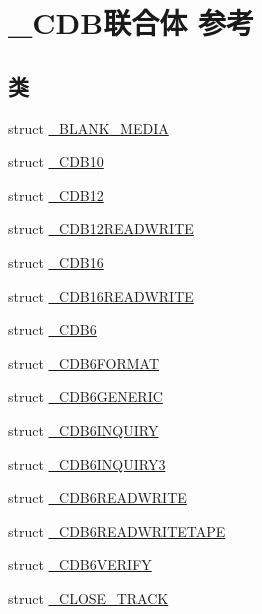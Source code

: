 \hypertarget{union___c_d_b}{}\section{\+\_\+\+C\+D\+B联合体 参考}
\label{union___c_d_b}
\subsection*{类}
\begin{DoxyCompactItemize}
\item 
struct \hyperlink{struct___c_d_b_1_1___b_l_a_n_k___m_e_d_i_a}{\+\_\+\+B\+L\+A\+N\+K\+\_\+\+M\+E\+D\+IA}
\item 
struct \hyperlink{struct___c_d_b_1_1___c_d_b10}{\+\_\+\+C\+D\+B10}
\item 
struct \hyperlink{struct___c_d_b_1_1___c_d_b12}{\+\_\+\+C\+D\+B12}
\item 
struct \hyperlink{struct___c_d_b_1_1___c_d_b12_r_e_a_d_w_r_i_t_e}{\+\_\+\+C\+D\+B12\+R\+E\+A\+D\+W\+R\+I\+TE}
\item 
struct \hyperlink{struct___c_d_b_1_1___c_d_b16}{\+\_\+\+C\+D\+B16}
\item 
struct \hyperlink{struct___c_d_b_1_1___c_d_b16_r_e_a_d_w_r_i_t_e}{\+\_\+\+C\+D\+B16\+R\+E\+A\+D\+W\+R\+I\+TE}
\item 
struct \hyperlink{struct___c_d_b_1_1___c_d_b6}{\+\_\+\+C\+D\+B6}
\item 
struct \hyperlink{struct___c_d_b_1_1___c_d_b6_f_o_r_m_a_t}{\+\_\+\+C\+D\+B6\+F\+O\+R\+M\+AT}
\item 
struct \hyperlink{struct___c_d_b_1_1___c_d_b6_g_e_n_e_r_i_c}{\+\_\+\+C\+D\+B6\+G\+E\+N\+E\+R\+IC}
\item 
struct \hyperlink{struct___c_d_b_1_1___c_d_b6_i_n_q_u_i_r_y}{\+\_\+\+C\+D\+B6\+I\+N\+Q\+U\+I\+RY}
\item 
struct \hyperlink{struct___c_d_b_1_1___c_d_b6_i_n_q_u_i_r_y3}{\+\_\+\+C\+D\+B6\+I\+N\+Q\+U\+I\+R\+Y3}
\item 
struct \hyperlink{struct___c_d_b_1_1___c_d_b6_r_e_a_d_w_r_i_t_e}{\+\_\+\+C\+D\+B6\+R\+E\+A\+D\+W\+R\+I\+TE}
\item 
struct \hyperlink{struct___c_d_b_1_1___c_d_b6_r_e_a_d_w_r_i_t_e_t_a_p_e}{\+\_\+\+C\+D\+B6\+R\+E\+A\+D\+W\+R\+I\+T\+E\+T\+A\+PE}
\item 
struct \hyperlink{struct___c_d_b_1_1___c_d_b6_v_e_r_i_f_y}{\+\_\+\+C\+D\+B6\+V\+E\+R\+I\+FY}
\item 
struct \hyperlink{struct___c_d_b_1_1___c_l_o_s_e___t_r_a_c_k}{\+\_\+\+C\+L\+O\+S\+E\+\_\+\+T\+R\+A\+CK}

\end{DoxyCompactItemize}
